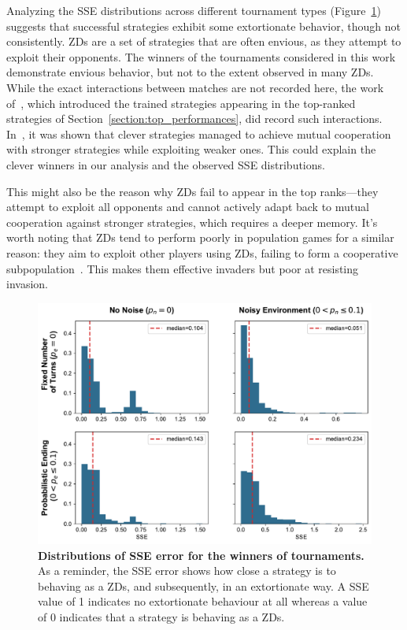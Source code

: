 \documentclass{article}
\begin{document}
Analyzing the SSE distributions across different tournament types
(Figure~\ref{fig:discussion_sse}) suggests that successful strategies exhibit
some extortionate behavior, though not consistently. ZDs are a set of strategies
that are often envious, as they attempt to exploit their opponents. The winners
of the tournaments considered in this work demonstrate envious behavior, but not
to the extent observed in many ZDs. While the exact interactions between matches
are not recorded here, the work of~\cite{Harper2017}, which introduced the
trained strategies appearing in the top-ranked strategies of
Section~\ref{section:top_performances}, did record such interactions.
In~\cite{Harper2017}, it was shown that clever strategies managed to achieve
mutual cooperation with stronger strategies while exploiting weaker ones. This
could explain the clever winners in our analysis and the observed SSE
distributions.

This might also be the reason why ZDs fail to appear in the top ranks—they
attempt to exploit all opponents and cannot actively adapt back to mutual
cooperation against stronger strategies, which requires a deeper memory. It's
worth noting that ZDs tend to perform poorly in population games for a similar
reason: they aim to exploit other players using ZDs, failing to form a
cooperative subpopulation~\cite{Knight2017evolution}. This makes them effective
invaders but poor at resisting invasion.

\begin{figure}[!htbp]
    \centering
        \centering
        \includegraphics[width=.75\textwidth]{../images/sse.pdf}
        \caption{\textbf{Distributions of SSE error for the winners of
        tournaments.} As a reminder, the SSE error shows how close a strategy is
        to behaving as a ZDs, and subsequently, in an extortionate way. A SSE
        value of 1 indicates no extortionate behaviour at all whereas a value of
        0 indicates that a strategy is behaving as a ZDs.}
        \label{fig:discussion_sse}
\end{figure}
\end{document}
